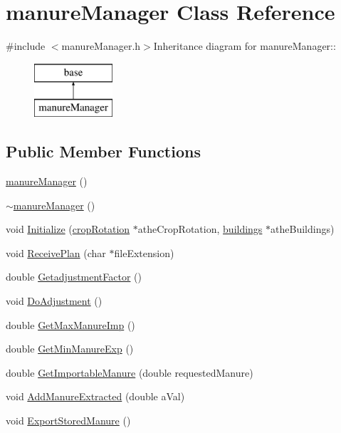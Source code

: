 \hypertarget{classmanure_manager}{
\section{manureManager Class Reference}
\label{classmanure_manager}
}


{\ttfamily \#include $<$manureManager.h$>$}Inheritance diagram for manureManager::\begin{figure}[H]
\begin{center}
\leavevmode
\includegraphics[height=2cm]{classmanure_manager}
\end{center}
\end{figure}
\subsection*{Public Member Functions}
\begin{DoxyCompactItemize}
\item 
\hyperlink{classmanure_manager_a659b516b1113e1095ec540eb38382baf}{manureManager} ()
\item 
\hyperlink{classmanure_manager_ad4fe88aba295797780129c969f7629fc}{$\sim$manureManager} ()
\item 
void \hyperlink{classmanure_manager_addbf8803c17d373bf79d7cdc349f8733}{Initialize} (\hyperlink{classcrop_rotation}{cropRotation} $\ast$atheCropRotation, \hyperlink{classbuildings}{buildings} $\ast$atheBuildings)
\item 
void \hyperlink{classmanure_manager_a500261bdfd91ae83071889cc072ac069}{ReceivePlan} (char $\ast$fileExtension)
\item 
double \hyperlink{classmanure_manager_a2237d1ee769ea8d80f06c486ae89e811}{GetadjustmentFactor} ()
\item 
void \hyperlink{classmanure_manager_aa04807903f10029a7b7f160bacd77336}{DoAdjustment} ()
\item 
double \hyperlink{classmanure_manager_a79ff84694eceabe97df0105a41455b60}{GetMaxManureImp} ()
\item 
double \hyperlink{classmanure_manager_aa99cc8ffe94eb2c89f9157565b5edcec}{GetMinManureExp} ()
\item 
double \hyperlink{classmanure_manager_ad1f560ee2b8ad735c93d70f90ed98fa4}{GetImportableManure} (double requestedManure)
\item 
void \hyperlink{classmanure_manager_a175d2fe4c3718bd804ef5e7d69bdbcf2}{AddManureExtracted} (double aVal)
\item 
void \hyperlink{classmanure_manager_a3d20907c84608bca89b497db1e24be4f}{ExportStoredManure} ()
\end{DoxyCompactItemize}


